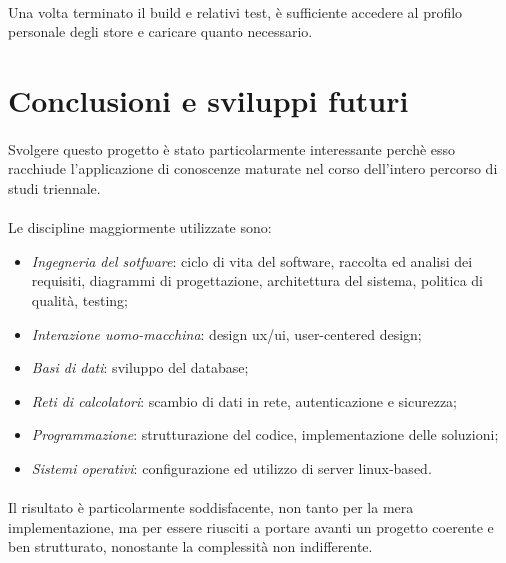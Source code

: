 \documentclass[11pt,a4paper,english]{article}
\begin{document}
\paragraph{} Una volta terminato il build e relativi test, è sufficiente accedere al profilo personale degli store e caricare quanto necessario. 


\newpage
\section{Conclusioni e sviluppi futuri}

\paragraph{} Svolgere questo progetto è stato particolarmente interessante perchè esso racchiude l'applicazione di conoscenze maturate nel corso dell'intero percorso di studi triennale. 

\paragraph{} Le discipline maggiormente utilizzate sono:
\begin{itemize}
    \item \emph{Ingegneria del sotfware}: ciclo di vita del software, raccolta ed analisi dei requisiti, diagrammi di progettazione, architettura del sistema, politica di qualità, testing;
    \item \emph{Interazione uomo-macchina}: design ux/ui, user-centered design;
    \item \emph{Basi di dati}: sviluppo del database;
    \item \emph{Reti di calcolatori}: scambio di dati in rete, autenticazione e sicurezza;
    \item \emph{Programmazione}: strutturazione del codice, implementazione delle soluzioni;
    \item \emph{Sistemi operativi}: configurazione ed utilizzo di server linux-based.
\end{itemize}

\paragraph{} Il risultato è particolarmente soddisfacente, non tanto per la mera implementazione, ma per essere riusciti a portare avanti un progetto coerente e ben strutturato, nonostante la complessità non indifferente. 
\end{document}

